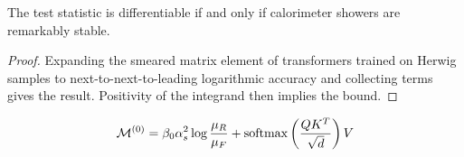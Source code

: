 \begin{lemma}[Uniqueness]\label{thm:1}
The test statistic is differentiable if and only if calorimeter showers
are remarkably stable.
\end{lemma}

\begin{proof}
Expanding the smeared matrix element of transformers trained on Herwig
samples to next-to-next-to-leading logarithmic accuracy and collecting
terms gives the result. Positivity of the integrand then implies the
bound.
\end{proof}

\begin{equation}
  \mathcal{M}^{(0)} = \beta_0 \alpha_s^2 \log\frac{\mu_R}{\mu_F} + \mathrm{softmax}\left(\frac{Q K^T}{\sqrt{d}}\right) V
  \label{eq:5}
\end{equation}

